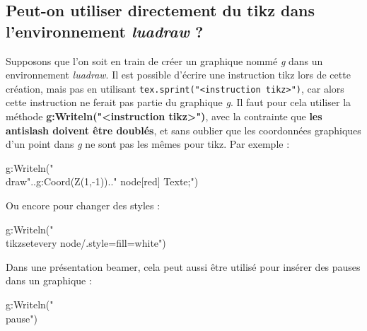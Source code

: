 \subsection{Peut-on utiliser directement du tikz dans l'environnement \emph{luadraw} ?}

Supposons que l'on soit en train de créer un graphique nommé \emph{g} dans un environnement \emph{luadraw}. Il est possible d'écrire une instruction tikz lors de cette création, mais pas en utilisant \verb|tex.sprint("<instruction tikz>")|, car alors cette instruction ne ferait pas partie du graphique \emph{g}. Il faut pour cela utiliser la méthode \textbf{g:Writeln("<instruction tikz>")}, avec la contrainte que \textbf{les antislash doivent être doublés}, et sans oublier que les coordonnées graphiques d'un point dans \emph{g} ne sont pas les mêmes pour tikz. Par exemple : 
\begin{Luacode}
g:Writeln("\\draw"..g:Coord(Z(1,-1)).." node[red] {Texte};")
\end{Luacode}

Ou encore pour changer des styles :
\begin{Luacode}
g:Writeln("\\tikzset{every node/.style={fill=white}}")
\end{Luacode}

Dans une présentation beamer, cela peut aussi être utilisé pour insérer des pauses dans un graphique :
\begin{Luacode}
g:Writeln("\\pause")
\end{Luacode}  

